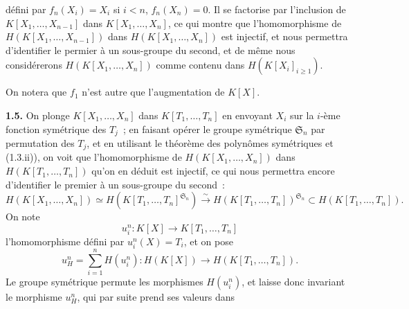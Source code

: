 défini par \(f_n(X_i)=X_i\) si \(i<n\), \(f_n(X_n)=0\). Il se factorise par l'inclusion de \(K[X_1,\ldots,X_{n-1}]\) dans \(K[X_1,\ldots,X_n]\), ce qui montre que l'homomorphisme de \(H(K[X_1,\ldots,X_{n-1}])\) dans \(H(K[X_1,\ldots,X_n])\) est injectif, et nous permettra d'identifier le permier à un sous-groupe du second, et de même nous considérerons \(H(K[X_1,\ldots,X_n])\) comme contenu dans \(H(K[X_i]_{i\geq 1})\).

On notera que \(f_1\) n'est autre que l'augmentation de \(K[X]\).

\textbf{1.5.} On plonge \(K[X_1,\ldots,X_n]\) dans \(K[T_1,\ldots,T_n]\) en envoyant \(X_i\) sur la \(i\)-ème fonction symétrique des \(T_j\)~; en faisant opérer le groupe symétrique \(\mathfrak S_n\) par permutation des \(T_j\), et en utilisant le théorème des polynômes symétriques et (1.3.ii)), on voit que l'homomorphisme de \(H(K[X_1,\ldots,X_n])\) dans \(H(K[T_1,\ldots,T_n])\) qu'on en déduit est injectif, ce qui nous permettra encore d'identifier le premier à un sous-groupe du second~:
\[
  H(K[X_1,\ldots,X_n])\simeq H(K[T_1,\ldots,T_n]^{\mathfrak S_n})\xrightarrow{\sim} H(K[T_1,\ldots,T_n])^{\mathfrak S_n}\subset H(K[T_1,\ldots,T_n]).
\]%
On note
\[
  u_i^n:K[X]\longrightarrow K[T_1,\ldots,T_n]
\]
l'homomorphisme défini par \(u_i^n(X)=T_i\), et on pose
\[
  u_H^n=\sum_{i=1}^n H(u_i^n):H(K[X])\longrightarrow H(K[T_1,\ldots,T_n]).
\]
Le groupe symétrique permute les morphismes \(H(u_i^n)\), et laisse donc invariant le morphisme \(u_H^n\), qui par suite prend ses valeurs dans

